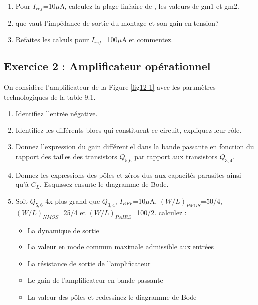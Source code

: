 \documentclass[paper=a4, fontsize=11pt]{article} %
\numberwithin{equation}{section} %
\numberwithin{figure}{section} %
\numberwithin{table}{section} %
\begin{document}
\begin{enumerate}
\item  Pour $I_{ref}$=10$\mu$A, calculez la plage linéaire de \vout, les valeurs de gm1 et gm2. 
\item que vaut l'impédance de sortie du montage et son  gain en tension?
\item Refaites les calculs pour $I_{ref}$=100$\mu$A et commentez.
\end{enumerate}

\subsection*{Exercice 2 : Amplificateur opérationnel}
On considère l'amplificateur de la Figure \ref{fig12-1} avec les paramètres technologiques de la table 9.1.
\begin{enumerate}
\item  Identifiez l'entrée négative.
\item  Identifiez les différents blocs qui constituent ce circuit, expliquez leur rôle.
\item  Donnez l'expression du gain différentiel dans la bande passante en fonction du rapport des tailles des transistors $Q_{5,6}$ par rapport aux transistors $Q_{3,4}$.
\item  Donnez les expressions des pôles et zéros dus aux capacités parasites ainsi qu'à $C_L$. Esquissez ensuite le diagramme de Bode.
\item  Soit $Q_{5,6}$ 4x plus grand que $Q_{3,4}$, $I_{REF}$=10$\mu$A, $(W/L)_{PMOS}$=50/4, $(W/L)_{NMOS}$=25/4 et $(W/L)_{PAIRE}$=100/2. calculez :
	\begin{itemize}
		\item La dynamique de sortie
		\item La valeur en mode commun maximale admissible aux entrées
		\item La résistance de sortie de l'amplificateur
		\item Le gain de l'amplificateur en bande passante
		\item La valeur des pôles et redessinez le diagramme de Bode
\end{itemize}

\end{enumerate}
\end{document}
